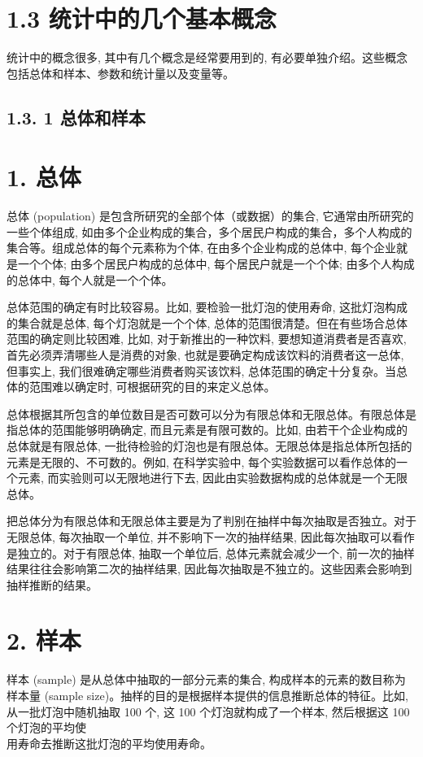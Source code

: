 \documentclass[10pt]{article}
\begin{document}
\begin{CJK*}{UTF8}{bsmi}
\section*{1.3 统计中的几个基本概念}
统计中的概念很多, 其中有几个概念是经常要用到的, 有必要单独介绍。这些概念包括总体和样本、参数和统计量以及变量等。

\subsection*{1.3. 1 总体和样本}
\section*{1. 总体}
总体 (population) 是包含所研究的全部个体（或数据）的集合, 它通常由所研究的一些个体组成, 如由多个企业构成的集合，多个居民户构成的集合，多个人构成的集合等。组成总体的每个元素称为个体, 在由多个企业构成的总体中, 每个企业就是一个个体; 由多个居民户构成的总体中, 每个居民户就是一个个体; 由多个人构成的总体中, 每个人就是一个个体。

总体范围的确定有时比较容易。比如, 要检验一批灯泡的使用寿命, 这批灯泡构成的集合就是总体, 每个灯泡就是一个个体, 总体的范围很清楚。但在有些场合总体范围的确定则比较困难, 比如, 对于新推出的一种饮料, 要想知道消费者是否喜欢, 首先必须弄清哪些人是消费的对象, 也就是要确定构成该饮料的消费者这一总体, 但事实上, 我们很难确定哪些消费者购买该饮料, 总体范围的确定十分复杂。当总体的范围难以确定时, 可根据研究的目的来定义总体。

总体根据其所包含的单位数目是否可数可以分为有限总体和无限总体。有限总体是指总体的范围能够明确确定, 而且元素是有限可数的。比如, 由若干个企业构成的总体就是有限总体, 一批待检验的灯泡也是有限总体。无限总体是指总体所包括的元素是无限的、不可数的。例如, 在科学实验中, 每个实验数据可以看作总体的一个元素, 而实验则可以无限地进行下去, 因此由实验数据构成的总体就是一个无限总体。

把总体分为有限总体和无限总体主要是为了判别在抽样中每次抽取是否独立。对于无限总体, 每次抽取一个单位, 并不影响下一次的抽样结果, 因此每次抽取可以看作是独立的。对于有限总体, 抽取一个单位后, 总体元素就会减少一个, 前一次的抽样结果往往会影响第二次的抽样结果, 因此每次抽取是不独立的。这些因素会影响到抽样推断的结果。

\section*{2. 样本}
样本 (sample) 是从总体中抽取的一部分元素的集合, 构成样本的元素的数目称为样本量 (sample size)。抽样的目的是根据样本提供的信息推断总体的特征。比如, 从一批灯泡中随机抽取 100 个, 这 100 个灯泡就构成了一个样本, 然后根据这 100 个灯泡的平均使\\
用寿命去推断这批灯泡的平均使用寿命。


\end{CJK*}
\end{document}
